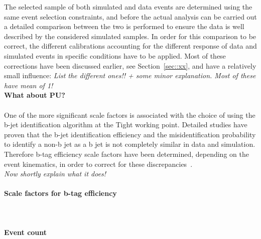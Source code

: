 The selected sample of both simulated and data events are determined using the same event selection constraints, and before the actual analysis can be carried out a detailed comparison between the two is performed to ensure the data is well described by the considered simulated samples.
In order for this comparison to be correct, the different calibrations accounting for the different response of data and simulated events in specific conditions have to be applied.
Most of these corrections have been discussed earlier, see Section~\ref{sec::xx}, and have a relatively small influence: \textit{List the different ones!! + some minor explanation. Most of these have mean of 1!}
\\
\textbf{What about PU?}
\\
\\
One of the more significant scale factors is associated with the choice of using the b-jet identification algorithm at the Tight working point. 
Detailed studies have proven that the b-jet identification efficiency and the misidentification probability to identify a non-b jet as a b jet is not completely similar in data and simulation. 
Therefore b-tag efficiency scale factors have been determined, depending on the event kinematics, in order to correct for these discrepancies~\cite{BTagSF}.
\\
\textit{Now shortly explain what it does!}

\paragraph{Scale factors for b-tag efficiency} \hfill \\

\paragraph{Event count} \hfill \\

